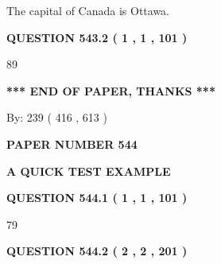\documentclass[12pt]{article}
\begin{document}
 
The capital of Canada is Ottawa.
 
 
 
 
  
\vspace{0.2in}
  
{\textbf{\Large{QUESTION
543.2 
 ( 1 , 1 , 101 )
}}}
  
  
 
 
\noindent{}

89
 
 
   
   
 \vspace{0.2in}
 
   
   
   
   
\vspace{1.0in} 
{\textbf{\large{ *** END OF PAPER, THANKS *** }}} 
   
   
\hspace{1.0in} By: 
 239 ( 416 ,  613 )
   
   
   
   
\newpage 
\setcounter{page}{ 
   544001 } 
   
   
   
   
 {\textbf{ \Large{ PAPER NUMBER  544  }}}
   
   
\vspace{0.2in}
   
   
   
   
   
   
 \vspace{0.2in}
{\LARGE {\textbf{ A QUICK TEST EXAMPLE}}}
   
   
  
\vspace{0.2in}
  
{\textbf{\Large{QUESTION
544.1 
 ( 1 , 1 , 101 )
}}}
  
  
 
 
\noindent{}

79
 
 
  
\vspace{0.2in}
  
{\textbf{\Large{QUESTION
544.2 
 ( 2 , 2 , 201 )
}}}
  
\end{document}
